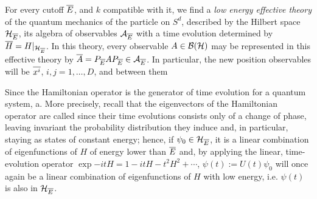 \begin{remark}
For every cutoff $\overline{E}$, and $k$ compatible with it, we find a \textit{low energy effective theory} of the quantum mechanics of the particle on $S^d$, described by the Hilbert space $\mathcal H_{\overline{E}}$, its algebra of observables $\mathcal A_{\overline{E}}$ with a time evolution determined by $\overline{H} = H|_{\mathcal H_{\overline{E}}}$. In this theory, every observable $A \in \mathcal B(\mathcal H)$ may be represented in this effective theory by $\overline{A} = P_{\overline{E}} A P_{\overline{E}} \in \mathcal A_{\overline{E}}$. In particular, the new position observables will be $\overline{x^i}$, $i, j = 1, \dots, D$, and between them  
\end{remark}

\begin{remark}
Since the Hamiltonian operator is the generator of time evolution for a quantum system, a. More precisely, recall that the eigenvectors of the Hamiltonian operator are called  since their time evolutions consists only of a change of phase, leaving invariant the probability distribution they induce and, in particular, staying as states of constant energy; 
hence, if $\psi_0 \in \mathcal H_{\overline{E}}$, it is a linear combination of eigenfunctions of $H$ of energy lower than $\overline{E}$ and, by applying the linear, time-evolution operator $\exp{-itH} = 1 - itH - t^2 H^2 + \cdots$, $\psi(t) := U(t) \psi_0$ will once again be a linear combination of eigenfunctions of $H$ with low energy, i.e. $\psi(t)$ is also in $\mathcal H_{\overline{E}}$.
\end{remark}

